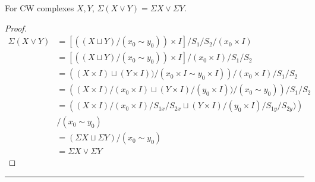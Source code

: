 \begin{prop} For CW complexes $X,Y$, $\Sigma(X\vee Y)=\Sigma X \vee \Sigma Y$.
\end{prop}
\begin{proof}
\begin{align*}
\Sigma(X\vee Y)&=\left[\left((X\sqcup Y)/(x_0\sim y_0)\right)\times I\right]/S_1/S_2/(x_0\times I)\\
&=\left[\left((X\sqcup Y)/(x_0\sim y_0)\right)\times I\right]/(x_0\times I)/S_1/S_2\\
&=\left((X\times I)\sqcup (Y\times I))/(x_0\times I\sim y_0\times I)\right)/(x_0\times I)/S_1/S_2\\
&=\left((X\times I)/(x_0\times I)\sqcup (Y\times I)/(y_0\times I))/(x_0\sim y_0)\right)/S_1/S_2\\
&=\left((X\times I)/(x_0\times I)/S_{1x}/S_{2x}\sqcup (Y\times I)/(y_0\times I)/S_{1y}/S_{2y})\right)\\
&/(x_0\sim y_0)\\
&=(\Sigma X \sqcup \Sigma Y)/(x_0\sim y_0)\\
&=\Sigma X\vee \Sigma Y
\end{align*}
\end{proof}

\noindent\rule{\textwidth}{1pt}
\newline